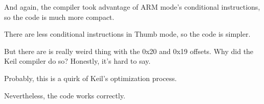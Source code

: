 ﻿

And again, the compiler took advantage of ARM mode's conditional instructions, 
so the code is much more compact.



\myindex{\CompilerAnomaly}
\label{Keil_anomaly}

There are less conditional instructions in Thumb mode, so the code is simpler.

But there are is really weird thing with the 0x20 and 0x19 offsets.
Why did the Keil compiler do so?
Honestly, it's hard to say.

Probably, this is a quirk of Keil's optimization process.

Nevertheless, the code works correctly.



